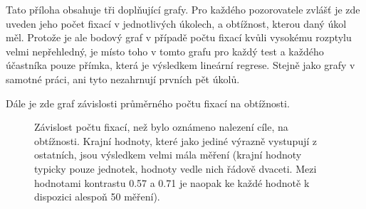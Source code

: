 

Tato příloha obsahuje tři doplňující grafy. Pro každého pozorovatele zvlášť je
zde uveden jeho počet fixací v jednotlivých úkolech, a obtížnost, kterou daný
úkol měl. Protože je ale bodový graf v případě počtu
fixací kvůli vysokému rozptylu velmi nepřehledný, je místo toho v tomto grafu
pro každý test a každého účastníka pouze přímka, která je výsledkem lineární regrese. Stejně jako grafy v samotné práci, ani tyto nezahrnují prvních pět úkolů. 

Dále je zde graf závislosti průměrného počtu fixací na obtížnosti.

\def\graphfigure#1#2#3{
\begin{figure}[h!]
\centering
\caption{#2}
\label{#3}
\end{figure}
}

\graphfigure{Kontrast_fix}{Závislost počtu fixací, než bylo oznámeno nalezení
cíle, na obtížnosti. Krajní hodnoty, které jako jediné výrazně vystupují z
ostatních, jsou výsledkem velmi mála měření (krajní hodnoty typicky pouze
jednotek, hodnoty vedle nich řádově dvaceti. Mezi hodnotami kontrastu 0.57 a
0.71 je naopak ke každé hodnotě k dispozici alespoň 50 měření). }{}

